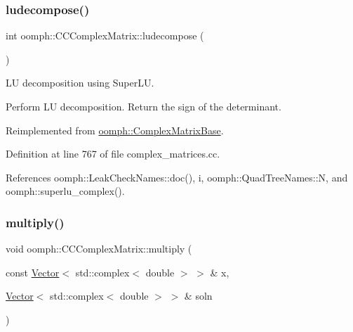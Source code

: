 \mbox{\label{classoomph_1_1CCComplexMatrix_a7076d4dc153b80fe4adbedbfb916b395}} 
\subsubsection{\texorpdfstring{ludecompose()}{ludecompose()}}
{\footnotesize\ttfamily int oomph\+::\+C\+C\+Complex\+Matrix\+::ludecompose (\begin{DoxyParamCaption}{ }\end{DoxyParamCaption})\hspace{0.3cm}{\ttfamily [virtual]}}



LU decomposition using Super\+LU. 

Perform LU decomposition. Return the sign of the determinant. 

Reimplemented from \hyperlink{classoomph_1_1ComplexMatrixBase_a11e1beeb7767e9bc5e511c17f80f097f}{oomph\+::\+Complex\+Matrix\+Base}.



Definition at line 767 of file complex\+\_\+matrices.\+cc.



References oomph\+::\+Leak\+Check\+Names\+::doc(), i, oomph\+::\+Quad\+Tree\+Names\+::N, and oomph\+::superlu\+\_\+complex().

\mbox{\label{classoomph_1_1CCComplexMatrix_a6c7ba50bf29c2e9f40a68a073534f261}} 
\subsubsection{\texorpdfstring{multiply()}{multiply()}}
{\footnotesize\ttfamily void oomph\+::\+C\+C\+Complex\+Matrix\+::multiply (\begin{DoxyParamCaption}\item[{const \hyperlink{classoomph_1_1Vector}{Vector}$<$ std\+::complex$<$ double $>$ $>$ \&}]{x,  }\item[{\hyperlink{classoomph_1_1Vector}{Vector}$<$ std\+::complex$<$ double $>$ $>$ \&}]{soln }\end{DoxyParamCaption})\hspace{0.3cm}{\ttfamily [virtual]}}



